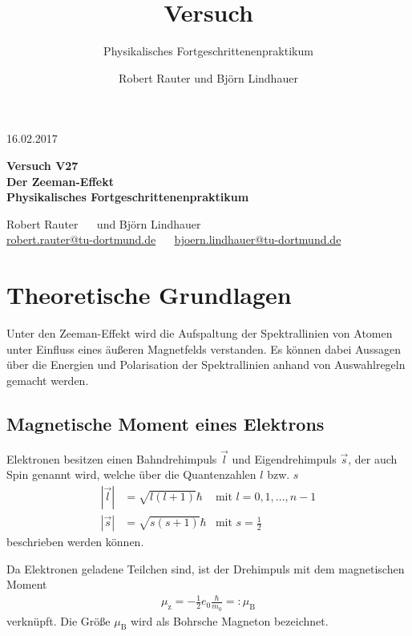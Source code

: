 \documentclass[captions=tableheading]{scrartcl}
\title{Versuch \versuchnummer\\ \versuchname}
\subtitle{Physikalisches Fortgeschrittenenpraktikum}
\author{Robert Rauter und Björn Lindhauer}
\date{\versuchdatum}
\newcommand{\versuchnummer}{V27}
\newcommand{\versuchname}{Der Zeeman-Effekt}
\newcommand{\versuchdatum}{16.02.2017}
\newcommand{\indx}[1]{\text{#1}}
\begin{document}
\begin{titlepage}
{\large \versuchdatum}
\vspace{7cm}
\begin{center}
\textbf{\huge Versuch \versuchnummer}\\\vspace{0.5cm}
\textbf{\huge \versuchname}\\
\vspace{0.2cm}
\textbf{Physikalisches Fortgeschrittenenpraktikum}\\
\vspace{9cm}

{\Large Robert Rauter \ \ \hspace{1.5cm} und \hspace{1.5cm} Björn Lindhauer}\\
{ \url{robert.rauter@tu-dortmund.de} \ \ \hspace{2cm} \url{bjoern.lindhauer@tu-dortmund.de}}
\end{center}
\end{titlepage}

\section{Theoretische Grundlagen}
Unter den Zeeman-Effekt wird die Aufspaltung der Spektrallinien von Atomen unter Einfluss eines äußeren Magnetfelds verstanden. 
Es können dabei Aussagen über die Energien und Polarisation der Spektrallinien anhand von Auswahlregeln gemacht werden.

\subsection{Magnetische Moment eines Elektrons}
Elektronen besitzen einen Bahndrehimpuls $\vec{l}$ und Eigendrehimpuls $\vec{s}$, der auch Spin genannt wird, welche über die Quantenzahlen $l$ bzw. $s$
\begin{align}
\left| \vec{l} \right| &= \sqrt{l\left(l+1\right)}\hbar &  \text{mit } l=0,1,...,n-1\\
\left| \vec{s} \right| &= \sqrt{s\left(s+1\right)}\hbar &  \text{mit }  s=\frac{1}{2}
\end{align}
beschrieben werden können.

Da Elektronen geladene Teilchen sind, ist der Drehimpuls mit dem magnetischen Moment 
\begin{align}
\mu_\indx{z}=-\frac{1}{2}e_\indx{0} \frac{\hbar}{m_0}=:\mu_\indx{B}
\end{align}
verknüpft. 
Die Größe $\mu_\indx{B}$ wird als Bohrsche Magneton bezeichnet.
\end{document}
